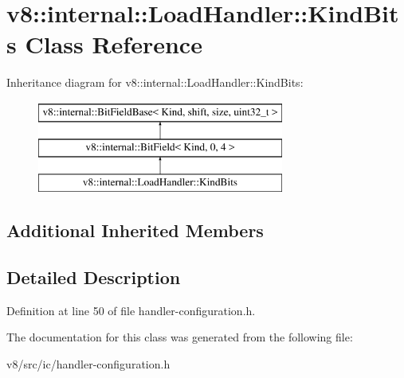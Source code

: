 \hypertarget{classv8_1_1internal_1_1LoadHandler_1_1KindBits}{}\section{v8\+:\+:internal\+:\+:Load\+Handler\+:\+:Kind\+Bits Class Reference}
\label{classv8_1_1internal_1_1LoadHandler_1_1KindBits}
Inheritance diagram for v8\+:\+:internal\+:\+:Load\+Handler\+:\+:Kind\+Bits\+:\begin{figure}[H]
\begin{center}
\leavevmode
\includegraphics[height=3.000000cm]{classv8_1_1internal_1_1LoadHandler_1_1KindBits}
\end{center}
\end{figure}
\subsection*{Additional Inherited Members}


\subsection{Detailed Description}


Definition at line 50 of file handler-\/configuration.\+h.



The documentation for this class was generated from the following file\+:\begin{DoxyCompactItemize}
\item 
v8/src/ic/handler-\/configuration.\+h\end{DoxyCompactItemize}
